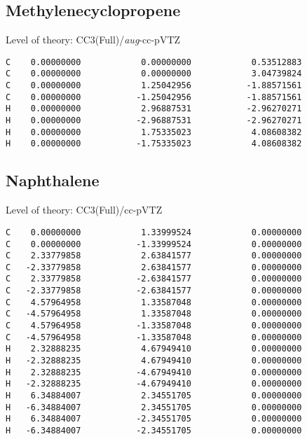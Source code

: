 \documentclass[journal=jctcce,manuscript=article,layout=traditional]{achemso}
\newcommand{\TZ}{cc-pVTZ}
\newcommand{\AVTZ}{\emph{aug}-cc-pVTZ}
\begin{document}
\subsection*{Methylenecyclopropene}

\begin{singlespace}
Level of theory: CC3(Full)/{\AVTZ}
\begin{verbatim}
C    0.00000000            0.00000000            0.53512883
C    0.00000000            0.00000000            3.04739824
C    0.00000000            1.25042956           -1.88571561
C    0.00000000           -1.25042956           -1.88571561
H    0.00000000            2.96887531           -2.96270271
H    0.00000000           -2.96887531           -2.96270271
H    0.00000000            1.75335023            4.08608382
H    0.00000000           -1.75335023            4.08608382
\end{verbatim}
\end{singlespace}

\subsection*{Naphthalene}

\begin{singlespace}
Level of theory: CC3(Full)/{\TZ}
\begin{verbatim}
C    0.00000000            1.33999524            0.00000000
C    0.00000000           -1.33999524            0.00000000
C    2.33779858            2.63841577            0.00000000
C   -2.33779858            2.63841577            0.00000000
C    2.33779858           -2.63841577            0.00000000
C   -2.33779858           -2.63841577            0.00000000
C    4.57964958            1.33587048            0.00000000
C   -4.57964958            1.33587048            0.00000000
C    4.57964958           -1.33587048            0.00000000
C   -4.57964958           -1.33587048            0.00000000
H    2.32888235            4.67949410            0.00000000
H   -2.32888235            4.67949410            0.00000000
H    2.32888235           -4.67949410            0.00000000
H   -2.32888235           -4.67949410            0.00000000
H    6.34884007            2.34551705            0.00000000
H   -6.34884007            2.34551705            0.00000000
H    6.34884007           -2.34551705            0.00000000
H   -6.34884007           -2.34551705            0.00000000
\end{verbatim}
\end{singlespace}
\end{document}
